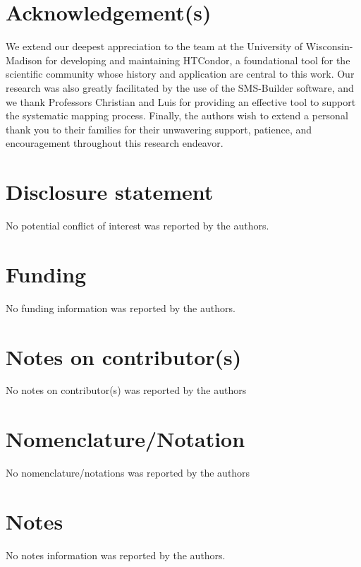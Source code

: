 \documentclass[]{interact}
\theoremstyle{plain}%
\theoremstyle{definition}
\theoremstyle{remark}
\begin{document}







\section*{Acknowledgement(s)}
We extend our deepest appreciation to the team at the University of Wisconsin-Madison for developing and maintaining HTCondor, a foundational tool for the scientific community whose history and application are central to this work. Our research was also greatly facilitated by the use of the SMS-Builder software, and we thank Professors Christian and Luis for providing an effective tool to support the systematic mapping process.
Finally, the authors wish to extend a personal thank you to their families for their unwavering support, patience, and encouragement throughout this research endeavor.

\section*{Disclosure statement}
No potential conflict of interest was reported by the authors.

\section*{Funding}
No funding information was reported by the authors.

\section*{Notes on contributor(s)}
No notes on contributor(s) was reported by the authors

\section*{Nomenclature/Notation}
No nomenclature/notations was reported by the authors

\section*{Notes}
No notes information was reported by the authors.










\end{document}
